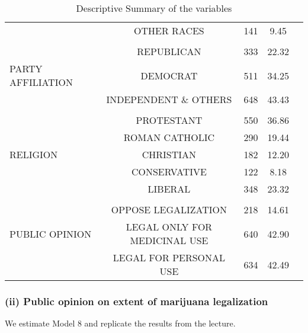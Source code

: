 \documentclass[a4paper]{article}
\begin{document}
\begin{tiny}
\begin{table}[ht]
\begin{tabular}{@{}lcccc@{}}
                &OTHER RACES           &     141         &      9.45          \\
                \cline{2-2}\\   
                &REPUBLICAN     &      333             &  22.32                  \\
    PARTY AFFILIATION   & DEMOCRAT           & 511           &34.25                    \\
                &INDEPENDENT \& OTHERS       &  648           &43.43                \\
                \cline{2-2}\\   
                &PROTESTANT       &     550              &36.86                    \\
                &ROMAN CATHOLIC        &290                   &19.44                    \\
    RELIGION    &CHRISTIAN           &182                   &12.20                    \\
                &CONSERVATIVE           &122                   &8.18                \\
                &LIBERAL        &  348                 &  23.32                  \\ 
                \cline{2-2}\\                     
                    &OPPOSE LEGALIZATION     &218        & 14.61                    \\
    PUBLIC OPINION  &LEGAL ONLY FOR MEDICINAL USE & 640      & 42.90                  \\
                    &LEGAL FOR PERSONAL USE      &634           &42.49              \\ \bottomrule
    \end{tabular}
    \caption{Descriptive Summary of the variables}
    \label{tab:Feb14Data}
    \end{table}

\end{tiny}

\pagebreak
\subsubsection*{(ii) Public opinion on extent of marijuana legalization}

We estimate Model 8 and replicate the results from the lecture.

\end{document}

